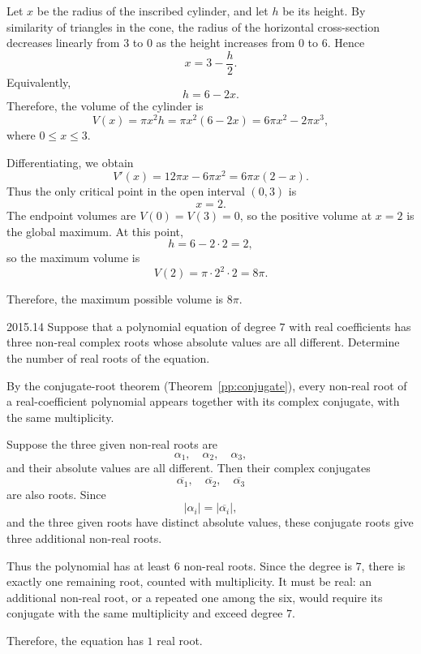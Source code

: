     \begin{solution}
        Let $x$ be the radius of the inscribed cylinder, and let $h$ be its height. By similarity of
        triangles in the cone, the radius of the horizontal cross-section decreases linearly from
        $3$ to $0$ as the height increases from $0$ to $6$. Hence
        \[
            x=3-\frac{h}{2}.
        \]
        Equivalently,
        \[
            h=6-2x.
        \]
        Therefore, the volume of the cylinder is
        \[
            V(x)
            =
            \pi x^2h
            =
            \pi x^2(6-2x)
            =
            6\pi x^2-2\pi x^3,
        \]
        where $0\leq x\leq 3$.

        Differentiating, we obtain
        \[
            V'(x)
            =
            12\pi x-6\pi x^2
            =
            6\pi x(2-x).
        \]
        Thus the only critical point in the open interval $(0,3)$ is
        \[
            x=2.
        \]
        The endpoint volumes are $V(0)=V(3)=0$, so the positive volume at $x=2$ is the global maximum. At this point,
        \[
            h=6-2\cdot 2=2,
        \]
        so the maximum volume is
        \[
            V(2)
            =
            \pi\cdot 2^2\cdot 2
            =
            8\pi.
        \]

        Therefore, the maximum possible volume is $\boxed{8\pi}$.
    \end{solution}

    \begin{pastproblem}{2015.14}
        Suppose that a polynomial equation of degree $7$ with real coefficients has three non-real
        complex roots whose absolute values are all different. Determine the number of real roots of
        the equation.
    \end{pastproblem}

    \begin{solution}
        By the conjugate-root theorem (Theorem~\ref{pp:conjugate}), every non-real
        root of a real-coefficient polynomial appears together with its complex
        conjugate, with the same multiplicity.

        Suppose the three given non-real roots are
        \[
            \alpha_1,\quad \alpha_2,\quad \alpha_3,
        \]
        and their absolute values are all different. Then their complex conjugates
        \[
            \overline{\alpha_1},\quad
            \overline{\alpha_2},\quad
            \overline{\alpha_3}
        \]
        are also roots. Since
        \[
            |\alpha_i|=|\overline{\alpha_i}|,
        \]
        and the three given roots have distinct absolute values, these conjugate roots give three
        additional non-real roots.

        Thus the polynomial has at least $6$ non-real roots. Since the degree is $7$, there is
        exactly one remaining root, counted with multiplicity. It must be real: an additional non-real root, or a repeated one among the six, would require its conjugate with the same multiplicity and exceed degree $7$.

        Therefore, the equation has $\boxed{1}$ real root.
    \end{solution}

